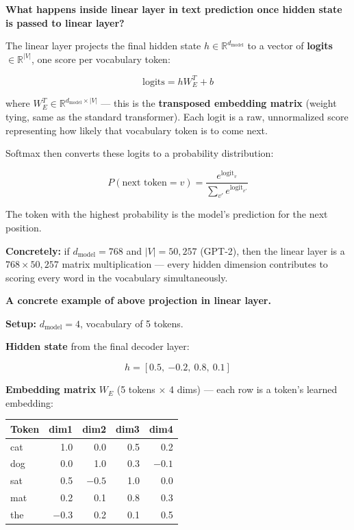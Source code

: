 \bigskip

\textbf{What happens inside linear layer in text prediction once hidden state is passed to linear layer?}

The linear layer projects the final hidden state $h \in \mathbb{R}^{d_{\mathrm{model}}}$ to a vector of \textbf{logits} $\in \mathbb{R}^{|V|}$, one score per vocabulary token:

\[
\mathrm{logits} = h W_E^T + b
\]

where $W_E^T \in \mathbb{R}^{d_{\mathrm{model}} \times |V|}$ --- this is the \textbf{transposed embedding matrix} (weight tying, same as the standard transformer). Each logit is a raw, unnormalized score representing how likely that vocabulary token is to come next.

Softmax then converts these logits to a probability distribution:

\[
P(\text{next token} = v) = \frac{e^{\mathrm{logit}_v}}{\sum_{v'} e^{\mathrm{logit}_{v'}}}
\]

The token with the highest probability is the model's prediction for the next position.

\medskip
\noindent\textbf{Concretely:} if $d_{\mathrm{model}} = 768$ and $|V| = 50{,}257$ (GPT-2), then the linear layer is a $768 \times 50{,}257$ matrix multiplication --- every hidden dimension contributes to scoring every word in the vocabulary simultaneously.

\bigskip

\textbf{A concrete example of above projection in linear layer.}

\noindent\textbf{Setup:} $d_{\mathrm{model}} = 4$, vocabulary of 5 tokens.

\medskip
\noindent\textbf{Hidden state} from the final decoder layer:

\[
h = [0.5,\ {-0.2},\ 0.8,\ 0.1]
\]

\noindent\textbf{Embedding matrix} $W_E$ (5 tokens $\times$ 4 dims) --- each row is a token's learned embedding:

\medskip
\begin{tabular}{|l|r|r|r|r|}
\hline
Token & dim1 & dim2 & dim3 & dim4 \\
\hline
cat & 1.0  & 0.0  & 0.5  & 0.2  \\
dog & 0.0  & 1.0  & 0.3  & $-0.1$ \\
sat & 0.5  & $-0.5$ & 1.0  & 0.0  \\
mat & 0.2  & 0.1  & 0.8  & 0.3  \\
the & $-0.3$ & 0.2  & 0.1  & 0.5  \\
\hline
\end{tabular}


